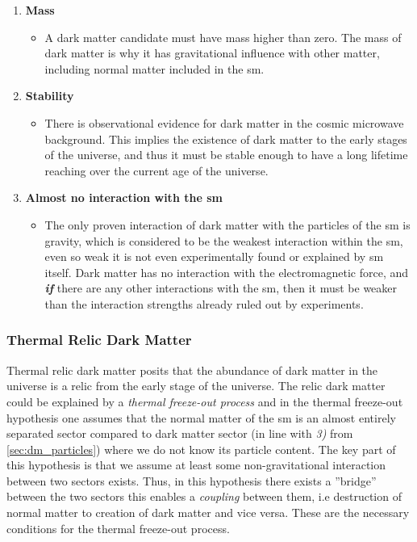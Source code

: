 \begin{enumerate}
    \item \textbf{Mass}
    \begin{itemize}
        \item A dark matter candidate must have mass higher than zero. The mass of dark matter is why it has gravitational influence with other matter, including normal matter included in the \gls{sm}. 
    \end{itemize}
    \item \textbf{Stability}
    \begin{itemize}
        \item There is observational evidence for dark matter in the cosmic microwave background. This implies the existence of dark matter to the early stages of the universe, and thus it must be stable enough to have a long lifetime reaching over the current age of the universe.
    \end{itemize}
    \item \textbf{Almost no interaction with the \gls{sm}}
    \begin{itemize}
        \item The only proven interaction of dark matter with the particles of the \gls{sm} is gravity, which is considered to be the weakest interaction within the \gls{sm}, even so weak it is not even experimentally found or explained by \gls{sm} itself. Dark matter has no interaction with the electromagnetic force, and \textbf{\textit{if}} there are any other interactions with the \gls{sm}, then it must be weaker than the interaction strengths already ruled out by experiments. 
    \end{itemize}
\end{enumerate}

\subsubsection{Thermal Relic Dark Matter}
\label{sec:termal_relic}


Thermal relic dark matter posits that the abundance of dark matter in the universe is a relic from the early stage of the universe. The relic dark matter could be explained by a \textit{thermal freeze-out process} and in the thermal freeze-out hypothesis one assumes that the normal matter of the \gls{sm} is an almost entirely separated sector compared to dark matter sector (in line with \textit{3)} from \ref{sec:dm_particles}) where we do not know its particle content. The key part of this hypothesis is that we assume at least some non-gravitational interaction between two sectors exists. Thus, in this hypothesis there exists a ''bridge'' between the two sectors this enables a \textit{coupling} between them, i.e destruction of normal matter to creation of dark matter and vice versa. These are the necessary conditions for the thermal freeze-out process. 

